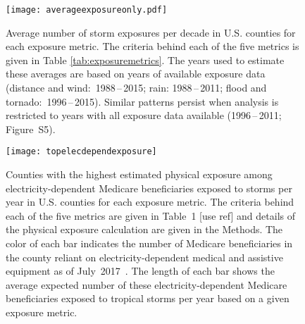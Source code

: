 \begin{figure}%
\centering
\texttt{[image: averageexposureonly.pdf]} 
\caption{Average number of storm exposures per decade in U.S. counties for each
exposure metric. The criteria behind each of the five metrics is given in Table
\ref{tab:exposuremetrics}. The years used to estimate these averages are based
on years of available exposure data (distance and wind:~1988\,--\,2015; rain:
1988\,--\,2011; flood and tornado:~1996\,--\,2015). Similar patterns persist when
analysis is restricted to years with all exposure data available (1996\,--\,2011;
Figure~S5).} 
\label{fig:averageexposure} 
\end{figure}

\clearpage

\begin{figure*}%
\centering
\texttt{[image: topelecdependexposure]}
\caption{Counties with the highest estimated physical exposure among
electricity-dependent Medicare beneficiaries exposed to storms per year in U.S.
counties for each exposure metric. The criteria behind each of the five metrics
are given in Table~1 [use ref] and details of the physical exposure
calculation are given in the Methods. The color of each bar indicates the
number of Medicare beneficiaries in the county reliant on electricity-dependent
medical and assistive equipment as of July~2017~\parencite{empower}. The length of
each bar shows the average expected number of these electricity-dependent
Medicare beneficiaries exposed to tropical storms per year based on a given
exposure metric.}
\label{fig:topelecdependexposure}
\end{figure*}

\clearpage

